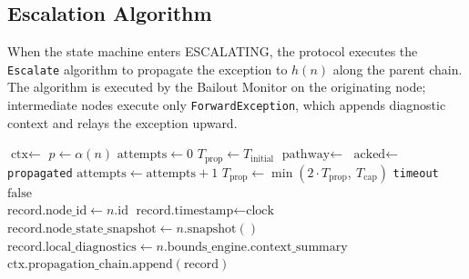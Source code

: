 \subsection{Escalation Algorithm}\label{sec:escalation-algorithm}

When the state machine enters ESCALATING, the protocol executes the \texttt{Escalate} algorithm to propagate the exception to $h(n)$ along the parent chain. The algorithm is executed by the Bailout Monitor on the originating node; intermediate nodes execute only \texttt{ForwardException}, which appends diagnostic context and relays the exception upward.

\begin{algorithm}[htbp]
\caption{Bailout Protocol escalation algorithm.}
\label{alg:escalate}
\begin{algorithmic}[1]
  \State $\text{ctx} \leftarrow$ 
  \State $p \leftarrow \alpha(n)$
  \State $\text{attempts} \leftarrow 0$
  \State $T_{\text{prop}} \leftarrow T_{\text{initial}}$
  \Repeat
    \State $\text{pathway} \leftarrow$ 
    \State $\text{acked} \leftarrow$ 
    \State {}
      \State {}
      \State \Return \texttt{propagated}
    \EndIf
    \State $\text{attempts} \leftarrow \text{attempts} + 1$
    \State $T_{\text{prop}} \leftarrow \min(2 \cdot T_{\text{prop}},\ T_{\text{cap}})$
    \State {}
      \State {}
      \State \Return \texttt{timeout}
    \EndIf
  \Until $\text{false}$
\EndProcedure
\\[6pt]
  \State $\text{record.node\_id} \leftarrow n.\text{id}$
  \State $\text{record.timestamp} \leftarrow \text{clock}$
  \State $\text{record.node\_state\_snapshot} \leftarrow n.\text{snapshot}()$
  \State $\text{record.local\_diagnostics} \leftarrow n.\text{bounds\_engine.context\_summary}$
  \State $\text{ctx.propagation\_chain.append}(\text{record})$
  \State {}

\end{algorithmic}
\end{algorithm}
